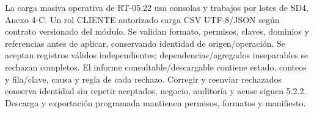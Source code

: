 La carga masiva operativa de RT-05.22 usa consolas y trabajos por lotes de SD4, Anexo 4-C. Un rol CLIENTE autorizado carga CSV UTF-8/JSON según contrato versionado del módulo. Se validan formato, permisos, claves, dominios y referencias antes de aplicar, conservando identidad de origen/operación. Se aceptan registros válidos independientes; dependencias/agregados inseparables se rechazan completos. El informe consultable/descargable contiene estado, conteos y fila/clave, causa y regla de cada rechazo. Corregir y reenviar rechazados conserva identidad sin repetir aceptados, negocio, auditoría y acuse siguen 5.2.2. Descarga y exportación programada mantienen permisos, formatos y manifiesto.
